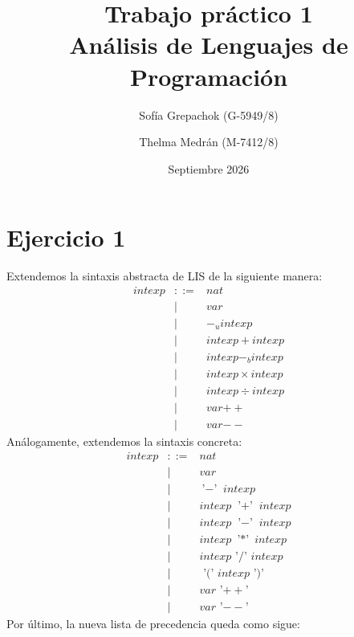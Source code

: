 \documentclass[12pt, a4paper]{article}
\title{Trabajo práctico 1 \\ \large Análisis de Lenguajes de Programación}
\author{Sofía Grepachok (G-5949/8) \and Thelma Medrán (M-7412/8)}
\date{Septiembre 2026}
\begin{document}
\maketitle


\section*{Ejercicio 1}

Extendemos la sintaxis abstracta de LIS de la siguiente manera:
\[
\begin{array}{rcl}
\mathit{intexp} & ::= & \mathit{nat} \\
                & \mid & \mathit{var} \\
                & \mid & -_u \mathit{intexp} \\
                & \mid & \mathit{intexp} + \mathit{intexp} \\
                & \mid & \mathit{intexp} -_b \mathit{intexp} \\
                & \mid & \mathit{intexp} \times \mathit{intexp} \\
                & \mid & \mathit{intexp} \div \mathit{intexp} \\
                & \mid & \mathit{var} \mathbf{++} \\
                & \mid & \mathit{var} \mathbf{--} 
\end{array}
\]
Análogamente, extendemos la sintaxis concreta:
\[
\begin{array}{rcl}
\mathit{intexp} & ::= & \mathit{nat} \\
                & \mid & \mathit{var} \\
                & \mid & \text{'\(-\)' } \mathit{intexp} \\
                & \mid & \mathit{intexp} \text{ '\(+\)' } \mathit{intexp} \\
                & \mid & \mathit{intexp} \text{ '\(-\)' } \mathit{intexp} \\
                & \mid & \mathit{intexp} \text{ '\(*\)' } \mathit{intexp} \\
                & \mid & \mathit{intexp} \text{ '\(/\)' } \mathit{intexp} \\
                & \mid & \text{ '\((\)' } \mathit{intexp} \text{ '\()\)' } \\
                & \mid & \mathit{var} \text{ '\(++\)'} \\
                & \mid & \mathit{var} \text{ '\(--\)'}                 
\end{array}
\]
Por último, la nueva lista de precedencia queda como sigue:
\end{document}
